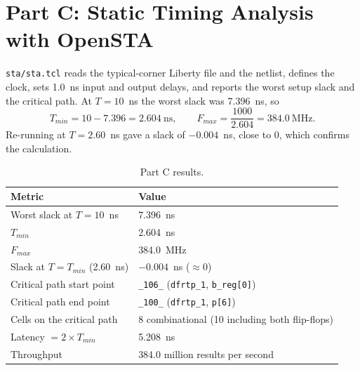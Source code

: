 \documentclass[11pt,a4paper]{article}
\newcommand{\cell}[1]{\texttt{#1}}
\begin{document}
\section{Part C: Static Timing Analysis with OpenSTA}

\texttt{sta/sta.tcl} reads the typical-corner Liberty file and the netlist, defines
the clock, sets 1.0~ns input and output delays, and reports the worst setup slack
and the critical path. At $T = 10$~ns the worst slack was 7.396~ns, so
\[
T_{min} = 10 - 7.396 = 2.604~\text{ns}, \qquad
F_{max} = \frac{1000}{2.604} = 384.0~\text{MHz}.
\]
Re-running at $T = 2.60$~ns gave a slack of $-0.004$~ns, close to 0, which confirms
the calculation.

\begin{table}[H]
\centering
\begin{tabular}{ll}
\toprule
Metric & Value \\
\midrule
Worst slack at $T = 10$~ns & 7.396~ns \\
$T_{min}$ & 2.604~ns \\
$F_{max}$ & 384.0~MHz \\
Slack at $T = T_{min}$ (2.60~ns) & $-0.004$~ns ($\approx 0$) \\
Critical path start point & \texttt{\_106\_} (\cell{dfrtp\_1}, \texttt{b\_reg[0]}) \\
Critical path end point & \texttt{\_100\_} (\cell{dfrtp\_1}, \texttt{p[6]}) \\
Cells on the critical path & 8 combinational (10 including both flip-flops) \\
Latency $= 2 \times T_{min}$ & 5.208~ns \\
Throughput & 384.0 million results per second \\
\bottomrule
\end{tabular}
\caption{Part C results.}
\end{table}
\end{document}
